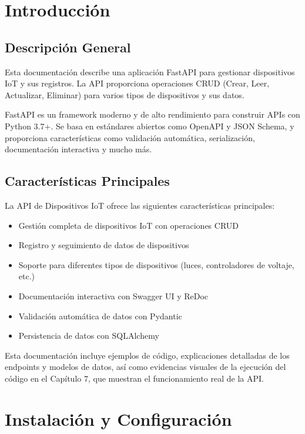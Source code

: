\documentclass[12pt,letterpaper]{report}
\begin{document}
\tableofcontents
\thispagestyle{fancy}

\newpage

\chapter{Introducción}

\section{Descripción General}
Esta documentación describe una aplicación FastAPI para gestionar dispositivos IoT y sus registros. La API proporciona operaciones CRUD (Crear, Leer, Actualizar, Eliminar) para varios tipos de dispositivos y sus datos.

FastAPI es un framework moderno y de alto rendimiento para construir APIs con Python 3.7+. Se basa en estándares abiertos como OpenAPI y JSON Schema, y proporciona características como validación automática, serialización, documentación interactiva y mucho más.

\section{Características Principales}
La API de Dispositivos IoT ofrece las siguientes características principales:

\begin{itemize}
    \item Gestión completa de dispositivos IoT con operaciones CRUD
    \item Registro y seguimiento de datos de dispositivos
    \item Soporte para diferentes tipos de dispositivos (luces, controladores de voltaje, etc.)
    \item Documentación interactiva con Swagger UI y ReDoc
    \item Validación automática de datos con Pydantic
    \item Persistencia de datos con SQLAlchemy
\end{itemize}

Esta documentación incluye ejemplos de código, explicaciones detalladas de los endpoints y modelos de datos, así como evidencias visuales de la ejecución del código en el Capítulo 7, que muestran el funcionamiento real de la API.

\chapter{Instalación y Configuración}
\end{document}
